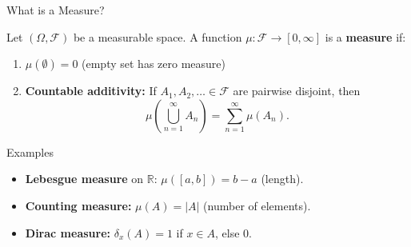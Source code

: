 \documentclass{beamer}
\begin{document}
\begin{frame}{What is a Measure?}
    \begin{definition}[Measure]
        Let $(\Omega, \mathscr{F})$ be a measurable space. A function $\mu: \mathscr{F} \to [0, \infty]$ is a \textbf{measure} if:
        \begin{enumerate}
            \item $\mu(\emptyset) = 0$ \quad (empty set has zero measure)
            \item \textbf{Countable additivity:} If $A_1, A_2, \ldots \in \mathscr{F}$ are pairwise disjoint, then
            \[
                \mu\left(\bigcup_{n=1}^\infty A_n\right) = \sum_{n=1}^\infty \mu(A_n).
            \]
        \end{enumerate}
    \end{definition}

    \begin{exampleblock}{Examples}
        \begin{itemize}
            \item \textbf{Lebesgue measure} on $\mathbb{R}$: $\mu([a,b]) = b - a$ (length).
            \item \textbf{Counting measure:} $\mu(A) = |A|$ (number of elements).
            \item \textbf{Dirac measure:} $\delta_x(A) = 1$ if $x \in A$, else $0$.
        \end{itemize}
    \end{exampleblock}
\end{frame}
\end{document}
